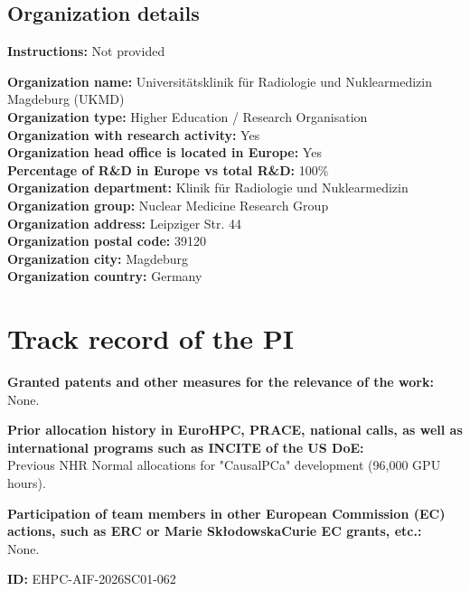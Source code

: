 \documentclass[11pt, a4paper]{article}
\begin{document}
\subsection*{Organization details}

\noindent\textbf{Instructions:} Not provided

\vspace{0.5em}
\noindent\textbf{Organization name:} Universitätsklinik für Radiologie und Nuklearmedizin Magdeburg (UKMD) \\
\textbf{Organization type:} Higher Education / Research Organisation \\
\textbf{Organization with research activity:} Yes \\
\textbf{Organization head office is located in Europe:} Yes \\
\textbf{Percentage of R\&D in Europe vs total R\&D:} 100\% \\
\textbf{Organization department:} Klinik für Radiologie und Nuklearmedizin \\
\textbf{Organization group:} Nuclear Medicine Research Group \\
\textbf{Organization address:} Leipziger Str. 44 \\
\textbf{Organization postal code:} 39120 \\
\textbf{Organization city:} Magdeburg \\
\textbf{Organization country:} Germany

\section*{Track record of the PI}

\noindent\textbf{Granted patents and other measures for the relevance of the work:} \\
None.

\vspace{0.5em}
\noindent\textbf{Prior allocation history in EuroHPC, PRACE, national calls, as well as international programs such as INCITE of the US DoE:} \\
Previous NHR Normal allocations for "CausalPCa" development (96,000 GPU hours).

\vspace{0.5em}
\noindent\textbf{Participation of team members in other European Commission (EC) actions, such as ERC or Marie SkłodowskaCurie EC grants, etc.:} \\
None.

\vspace{0.5em}
\noindent\textbf{ID:} EHPC-AIF-2026SC01-062
\end{document}
